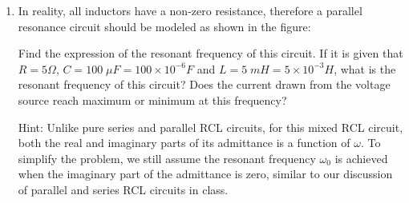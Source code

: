 \begin{enumerate}
\item In reality, all inductors have a non-zero resistance, therefore a 
parallel resonance circuit should be modeled as shown in the figure:


Find the expression of the resonant frequency of this circuit. If it is 
given that $R=5\Omega$, $C=100\;\mu F=100\times 10^{-6}F$ and $L=5\; 
mH=5\times 10^{-3}H$, what is the resonant frequency of this circuit? 
Does the current drawn from the voltage source reach maximum or minimum 
at this frequency?

Hint: Unlike pure series and parallel RCL circuits, for this mixed RCL
circuit, both the real and imaginary parts of its admittance is a function 
of $\omega$. To simplify the problem, we still assume the resonant 
frequency $\omega_0$ is achieved when the imaginary part of the admittance
is zero, similar to our discussion of parallel and series RCL circuits in 
class.


% 

%
%
% 



\end{enumerate}
